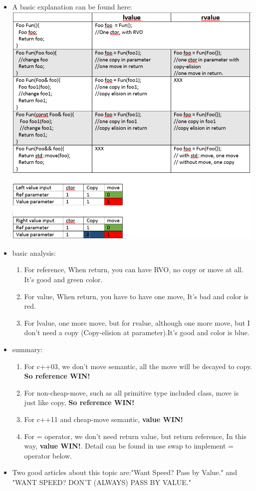\documentclass[a4paper,12pt,twoside]{book}
\begin{document}
\begin{itemize}
\item A basic explanation can be found here: \\
\includegraphics[scale=1.0]{pics/value.png}
\item basic analysis:
\begin{enumerate}
\item For reference, When return, you can have RVO, no copy or move at all. It's good and green color.
\item For value, When return, you have to have one move, It's bad and color is red.
\item For lvalue, one more move, but for rvalue, although one more move, but I don't need a copy (Copy-elision at parameter).It's good and color is blue.
\end{enumerate}

\item summary:
\begin{enumerate}
\item For c++03, we don't move semantic, all the move will be decayed to copy. \textbf{So reference WIN!}

\item For non-cheap-move, such as all primitive type included class, move is just like copy, \textbf{So reference WIN!}

\item For c++11 and cheap-move semantic, \textbf{value WIN!}

\item For = operator, we don't need return value, but return reference, In this way, \textbf{value WIN!}. Detail can be found in use swap to implement = operator below. 

\end{enumerate}

\item Two good articles about this topic are:"Want Speed? Pass by Value." and "WANT SPEED? DON’T (ALWAYS) PASS BY VALUE."

\end{itemize}
\end{document}
